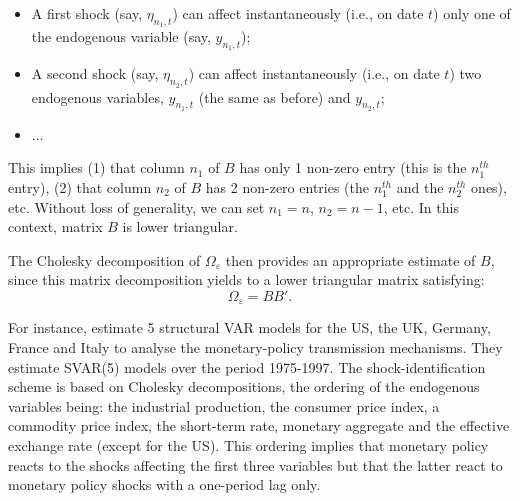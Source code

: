 \documentclass[
  12pt,
]{book}
\providecommand{\tightlist}{%
  \setlength{\itemsep}{0pt}\setlength{\parskip}{0pt}}
\theoremstyle{definition}
\theoremstyle{definition}
\theoremstyle{definition}
\theoremstyle{definition}
\theoremstyle{remark}
\begin{document}
\begin{itemize}
\tightlist
\item
  A first shock (say, \(\eta_{n_1,t}\)) can affect instantaneously
  (i.e., on date \(t\)) only one of the endogenous variable (say, \(y_{n_1,t}\));
\item
  A second shock (say, \(\eta_{n_2,t}\)) can affect instantaneously
  (i.e., on date \(t\)) two endogenous variables, \(y_{n_1,t}\) (the same as before) and \(y_{n_2,t}\);
\item
  \(\dots\)
\end{itemize}

This implies (1) that column \(n_1\) of \(B\) has only 1 non-zero entry (this is the \(n_1^{th}\) entry), (2) that column \(n_2\) of \(B\) has 2 non-zero entries (the \(n_1^{th}\) and the \(n_2^{th}\) ones), etc. Without loss of generality, we can set \(n_1=n\), \(n_2=n-1\), etc. In this context, matrix \(B\) is lower triangular.

The Cholesky decomposition of \(\Omega_{\varepsilon}\) then provides an appropriate estimate of \(B\), since this matrix decomposition yields to a lower triangular matrix satisfying:
\[
\Omega_\varepsilon = BB'.
\]

For instance, \citet{DEDOLA20051543} estimate 5 structural VAR models for the US, the UK, Germany, France and Italy to analyse the monetary-policy transmission mechanisms. They estimate SVAR(5) models over the period 1975-1997. The shock-identification scheme is based on Cholesky decompositions, the ordering of the endogenous variables being: the industrial production, the consumer price index, a commodity price index, the short-term rate, monetary aggregate and the effective exchange rate (except for the US). This ordering implies that monetary policy reacts to the shocks affecting the first three variables but that the latter react to monetary policy shocks with a one-period lag only.
\end{document}

